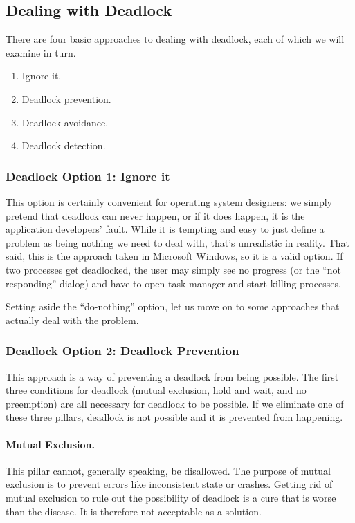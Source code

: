 \subsection*{Dealing with Deadlock}

There are four basic approaches to dealing with deadlock, each of which we will examine in turn.
\begin{enumerate}
	\item Ignore it.
	\item Deadlock prevention.
	\item Deadlock avoidance.
	\item Deadlock detection.
\end{enumerate}

\subsubsection*{Deadlock Option 1: Ignore it}
This option is certainly convenient for operating system designers: we simply pretend that deadlock can never happen, or if it does happen, it is the application developers' fault. While it is tempting and easy to just define a problem as being nothing we need to deal with, that's unrealistic in reality. That said, this is the approach taken in Microsoft Windows, so it is a valid option. If two processes get deadlocked, the user may simply see no progress (or the ``not responding'' dialog) and have to open task manager and start killing processes.

Setting aside the ``do-nothing'' option, let us move on to some approaches that actually deal with the problem.

\subsubsection*{Deadlock Option 2: Deadlock Prevention}

This approach is a way of preventing a deadlock from being possible. The first three conditions for deadlock (mutual exclusion, hold and wait, and no preemption) are all necessary for deadlock to be possible. If we eliminate one of these three pillars, deadlock is not possible and it is prevented from happening.

\paragraph{Mutual Exclusion.} This pillar cannot, generally speaking, be disallowed. The purpose of  mutual exclusion is to prevent errors like inconsistent state or crashes. Getting rid of mutual exclusion to rule out the possibility of deadlock is a cure that is worse than the disease. It is therefore not acceptable as a solution.

